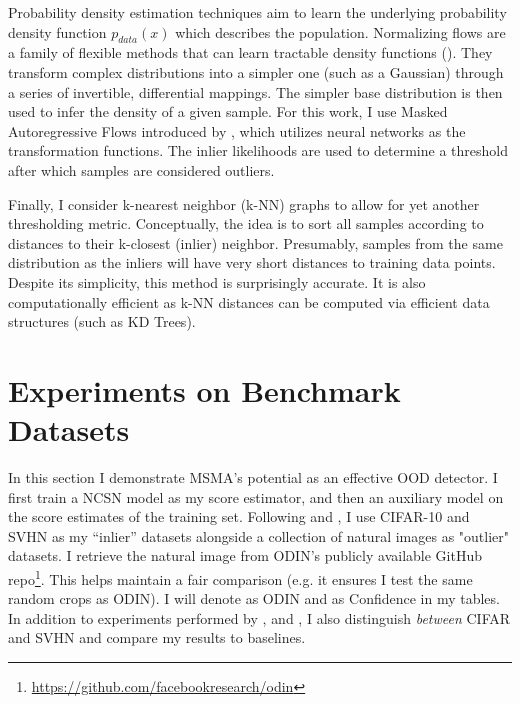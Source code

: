 Probability density estimation techniques aim to learn the underlying probability density function $p_{data} (x)$ which describes the population. Normalizing flows are a family of flexible methods that can learn tractable density functions (\cite{Papamakarios2019}). They transform complex distributions into a simpler one (such as a Gaussian) through a series of invertible, differential mappings. The simpler base distribution is then used to infer the density of a given sample. For this work, I use Masked Autoregressive Flows introduced by \cite{Papamakarios2017masked}, which utilizes neural networks as the transformation functions. The inlier likelihoods are used to determine a threshold after which samples are considered outliers.

Finally, I consider k-nearest neighbor (k-NN) graphs to allow for yet another thresholding metric. Conceptually, the idea is to sort all samples according to distances to their k-closest (inlier) neighbor. Presumably, samples from the same distribution as the inliers will have very short distances to training data points. Despite its simplicity, this method is surprisingly accurate. It is also computationally efficient as k-NN distances can be computed via efficient data structures (such as KD Trees).


\section{Experiments on Benchmark Datasets}
\label{experiments}

In this section I demonstrate MSMA's potential as an effective OOD detector. I first train a NCSN model as my score estimator, and then an auxiliary model on the score estimates of the training set. Following \cite{Liang2017} and \cite{Devries}, I use CIFAR-10 and SVHN as my “inlier” datasets alongside a collection of natural images as "outlier" datasets. I retrieve the natural image from ODIN's publicly available GitHub repo\footnote{\url{https://github.com/facebookresearch/odin}}. This helps maintain a fair comparison (e.g. it ensures I test the same random crops as ODIN). I will denote \cite{Liang2017} as ODIN and \cite{Devries} as Confidence in my tables.
In addition to experiments performed by \cite{Hendrycks2019}, \cite{Liang2017} and \cite{Devries}, I also distinguish \textit{between} CIFAR and SVHN and compare my results to baselines.



